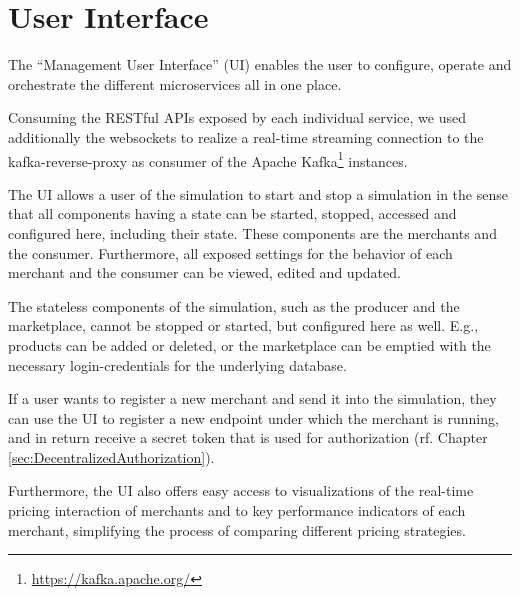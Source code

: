 \section{User Interface}
\label{sec:ui}
%
The ``Management User Interface'' (UI) enables the user to configure, operate and orchestrate the different microservices all in one place. 


Consuming the RESTful APIs exposed by each individual service, we used additionally the websockets to realize a real-time streaming connection to the kafka-reverse-proxy as consumer of the Apache Kafka\footnote{\url{https://kafka.apache.org/}} instances.

The UI allows a user of the simulation to start and stop a simulation in the sense that all components having a state can be started, stopped, accessed and configured here, including their state. These components are the merchants and the consumer. Furthermore, all exposed settings for the behavior of each merchant and the consumer can be viewed, edited and updated.

The stateless components of the simulation, such as the producer and the marketplace, cannot be stopped or started, but configured here as well. E.g., products can be added or deleted, or the marketplace can be emptied with the necessary login-credentials for the underlying database.

If a user wants to register a new merchant and send it into the simulation, they can use the UI to register a new endpoint under which the merchant is running, and in return receive a secret token that is used for authorization (rf. Chapter \ref{sec:DecentralizedAuthorization}). 

Furthermore, the UI also offers easy access to visualizations of the real-time pricing interaction of merchants and to key performance indicators of each merchant, simplifying the process of comparing different pricing strategies.